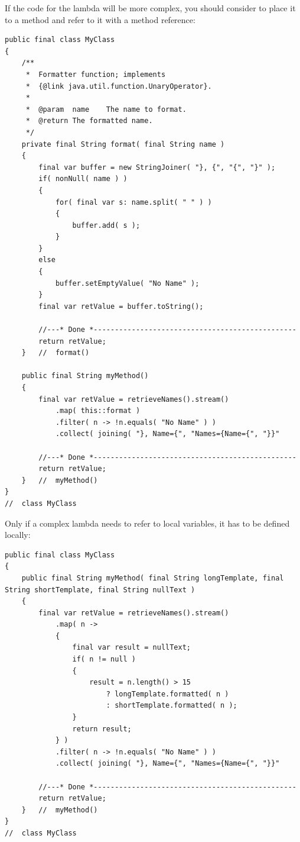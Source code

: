If the code for the lambda will be more complex, you should consider to place it to a method and refer to it with a method reference\autocite{ORACLE_DOC_LANGUAGE_SPECIFICATION:MethodReference}:
\begin{lstlisting}
public final class MyClass
{
    /**
     *  Formatter function; implements
     *  {@link java.util.function.UnaryOperator}.
     *
     *  @param  name    The name to format.
     *  @return The formatted name.
     */
    private final String format( final String name )
    {
        final var buffer = new StringJoiner( "}, {", "{", "}" );
        if( nonNull( name ) )
        {
            for( final var s: name.split( " " ) )
            {
                buffer.add( s );
            }
        }
        else
        {
            buffer.setEmptyValue( "No Name" );
        }
        final var retValue = buffer.toString();
        
        //---* Done *------------------------------------------------
        return retValue;
    }   //  format()
    
    public final String myMethod()
    {
        final var retValue = retrieveNames().stream()
            .map( this::format )
            .filter( n -> !n.equals( "No Name" ) )
            .collect( joining( "}, Name={", "Names={Name={", "}}"
        
        //---* Done *------------------------------------------------
        return retValue;
    }   //  myMethod()
}
//  class MyClass
\end{lstlisting}

Only if a complex lambda needs to refer to local variables, it has to be defined locally:
\begin{lstlisting}
public final class MyClass
{
    public final String myMethod( final String longTemplate, final String shortTemplate, final String nullText )
    {
        final var retValue = retrieveNames().stream()
            .map( n ->
            {
                final var result = nullText;
                if( n != null )
                {
                    result = n.length() > 15 
                        ? longTemplate.formatted( n ) 
                        : shortTemplate.formatted( n );
                }
                return result;
            } )
            .filter( n -> !n.equals( "No Name" ) )
            .collect( joining( "}, Name={", "Names={Name={", "}}"
        
        //---* Done *------------------------------------------------
        return retValue;
    }   //  myMethod()
}
//  class MyClass
\end{lstlisting}

